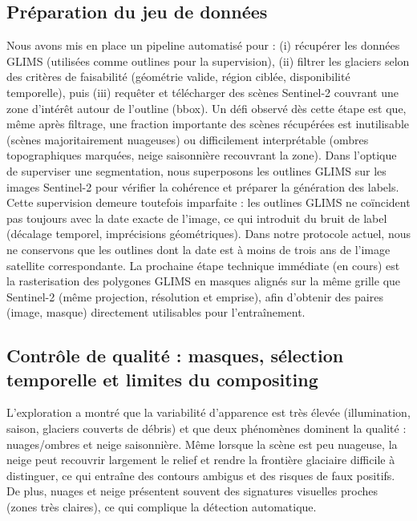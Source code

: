 \documentclass[10pt]{article}
\begin{document}
\subsection*{Préparation du jeu de données}
Nous avons mis en place un pipeline automatisé pour : (i) récupérer les données GLIMS (utilisées comme outlines pour la supervision), (ii) filtrer les glaciers selon des critères de faisabilité (géométrie valide, région ciblée, disponibilité temporelle), puis (iii) requêter et télécharger des scènes Sentinel-2 couvrant une zone d'intérêt autour de l'outline (bbox).
Un défi observé dès cette étape est que, même après filtrage, une fraction importante des scènes récupérées est inutilisable (scènes majoritairement nuageuses) ou difficilement interprétable (ombres topographiques marquées, neige saisonnière recouvrant la zone).
Dans l'optique de superviser une segmentation, nous superposons les outlines GLIMS sur les images Sentinel-2 pour vérifier la cohérence et préparer la génération des labels. Cette supervision demeure toutefois imparfaite : les outlines GLIMS ne coïncident pas toujours avec la date exacte de l'image, ce qui introduit du bruit de label (décalage temporel, imprécisions géométriques). Dans notre protocole actuel, nous ne conservons que les outlines dont la date est à moins de trois ans de l'image satellite correspondante. La prochaine étape technique immédiate (en cours) est la rasterisation des polygones GLIMS en masques alignés sur la même grille que Sentinel-2 (même projection, résolution et emprise), afin d'obtenir des paires (image, masque) directement utilisables pour l'entraînement.

\subsection*{Contrôle de qualité : masques, sélection temporelle et limites du compositing}
L'exploration a montré que la variabilité d'apparence est très élevée (illumination, saison, glaciers couverts de débris) et que deux phénomènes dominent la qualité : nuages/ombres et neige saisonnière. Même lorsque la scène est peu nuageuse, la neige peut recouvrir largement le relief et rendre la frontière glaciaire difficile à distinguer, ce qui entraîne des contours ambigus et des risques de faux positifs. De plus, nuages et neige présentent souvent des signatures visuelles proches (zones très claires), ce qui complique la détection automatique.
\end{document}

